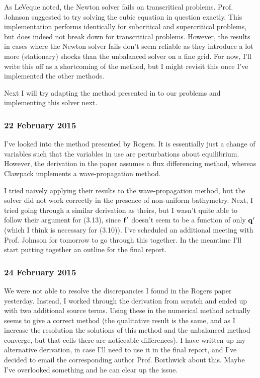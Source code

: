 \documentclass[a4paper,onecolumn,11pt]{report}
\begin{document}
As LeVeque noted, the Newton solver fails on transcritical problems. Prof. Johnson suggested to try solving the cubic equation in question exactly. This implementation performs identically for subcritical and supercritical problems, but does indeed not break down for transcritical problems. However, the results in cases where the Newton solver fails don't seem reliable as they introduce a lot more (stationary) shocks than the unbalanced solver on a fine grid. For now, I'll write this off as a shortcoming of the method, but I might revisit this once I've implemented the other methods.

Next I will try adapting the method presented in \citet{rogers2003mathematical} to our problems and implementing this solver next.

\subsubsection*{22 February 2015}

I've looked into the method presented by Rogers. It is essentially just a change of variables such that the variables in use are perturbations about equilibrium. However, the derivation in the paper assumes a flux differencing method, whereas Clawpack implements a wave-propagation method.

I tried naively applying their results to the wave-propagation method, but the solver did not work correctly in the presence of non-uniform bathymetry. Next, I tried going through a similar derivation as theirs, but I wasn't quite able to follow their argument for (3.13), since $\vb{f'}$ doesn't seem to be a function of only $\vb{q'}$ (which I think is necessary for (3.10)). I've scheduled an additional meeting with Prof. Johnson for tomorrow to go through this together. In the meantime I'll start putting together an outline for the final report.

\subsubsection*{24 February 2015}

We were not able to resolve the discrepancies I found in the Rogers paper yesterday. Instead, I worked through the derivation from scratch and ended up with two additional source terms. Using these in the numerical method actually seems to give a correct method (the qualitative result is the same, and as I increase the resolution the solutions of this method and the unbalanced method converge, but that  cells there are noticeable differences). I have written up my alternative derivation, in case I'll need to use it in the final report, and I've decided to email the corresponding author Prof. Borthwick about this. Maybe I've overlooked something and he can clear up the issue.
\end{document}
